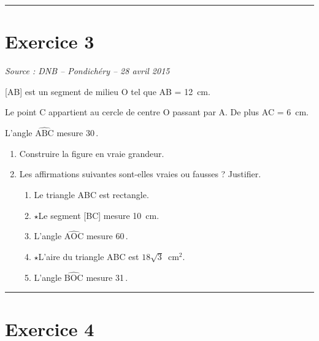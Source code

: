 \documentclass[11pt,a4paper]{article}
\newcommand{\horsprog}{\textbf{\large $\star$}\;}
\newcommand{\source}[1]{%
    \begin{flushright}
        \small\itshape Source : #1
    \end{flushright}
}
\newcommand{\separation}{%
    \vspace{0.4cm}
    \hrule
    \vspace{0.7cm}
}
\begin{document}
\separation



\section*{Exercice 3}

\source{DNB -- Pondichéry -- 28 avril 2015}

[AB] est un segment de milieu O tel que AB = 12~cm.

Le point C appartient au cercle de centre O passant par A.
De plus AC = 6~cm.

L'angle $\widehat{\text{ABC}}$ mesure 30\,\degres.

\medskip

\begin{enumerate}

\item Construire la figure en vraie grandeur.

\item Les affirmations suivantes sont-elles vraies ou fausses ?
Justifier.

    \begin{enumerate}

    \item Le triangle ABC est rectangle.

    \item \horsprog Le segment [BC] mesure 10~cm.

    \item L'angle $\widehat{\text{AOC}}$ mesure 60\,\degres.

    \item \horsprog L'aire du triangle ABC est
    $18\sqrt{3}$~cm$^2$.

    \item L'angle $\widehat{\text{BOC}}$ mesure 31\,\degres.

    \end{enumerate}

\end{enumerate}


\separation



\section*{Exercice 4}
\end{document}
